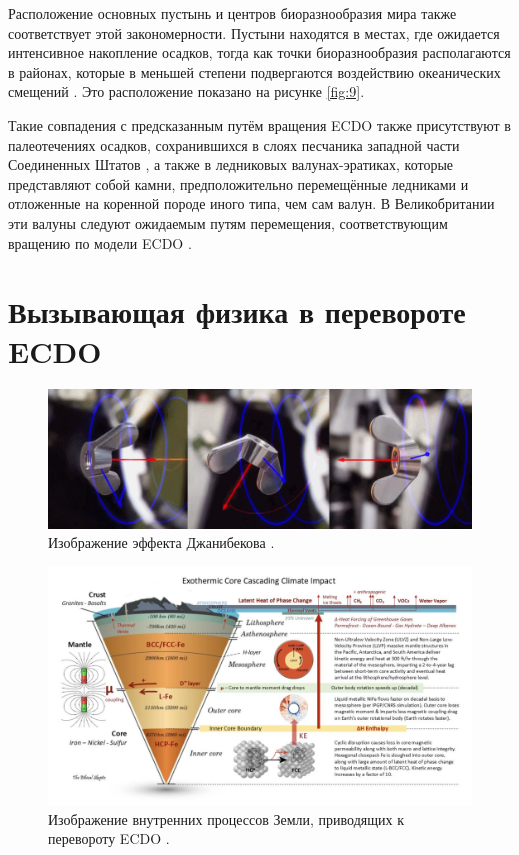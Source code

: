 \documentclass[10pt,twocolumn,letterpaper]{article}
\begin{document}
Расположение основных пустынь и центров биоразнообразия мира также соответствует этой закономерности. Пустыни находятся в местах, где ожидается интенсивное накопление осадков, тогда как точки биоразнообразия располагаются в районах, которые в меньшей степени подвергаются воздействию океанических смещений \cite{28}. Это расположение показано на рисунке \ref{fig:9}.

Такие совпадения с предсказанным путём вращения ECDO также присутствуют в палеотечениях осадков, сохранившихся в слоях песчаника западной части Соединенных Штатов \cite{21}, а также в ледниковых валунах-эратиках, которые представляют собой камни, предположительно перемещённые ледниками и отложенные на коренной породе иного типа, чем сам валун. В Великобритании эти валуны следуют ожидаемым путям перемещения, соответствующим вращению по модели ECDO \cite{67,68}.

\section{Вызывающая физика в перевороте ECDO}

\begin{figure}
\begin{center}

\includegraphics[width=1\textwidth]{dzhani.jpg}
\end{center}
   \caption{Изображение эффекта Джанибекова \cite{28}.}
\label{fig:10}
\end{figure}

\begin{figure}[t]
\begin{center}
\includegraphics[width=1\textwidth]{layers.jpg}
\end{center}
   \caption{Изображение внутренних процессов Земли, приводящих к перевороту ECDO \cite{129}.}
\label{fig:11}
\end{figure}
\end{document}
